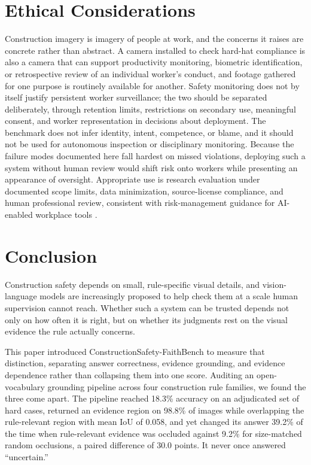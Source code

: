\documentclass[conference]{IEEEtran}
\begin{document}
\section{Ethical Considerations}

Construction imagery is imagery of people at work, and the concerns it raises are concrete rather than abstract. A camera installed to check hard-hat compliance is also a camera that can support productivity monitoring, biometric identification, or retrospective review of an individual worker's conduct, and footage gathered for one purpose is routinely available for another. Safety monitoring does not by itself justify persistent worker surveillance; the two should be separated deliberately, through retention limits, restrictions on secondary use, meaningful consent, and worker representation in decisions about deployment. The benchmark does not infer identity, intent, competence, or blame, and it should not be used for autonomous inspection or disciplinary monitoring. Because the failure modes documented here fall hardest on missed violations, deploying such a system without human review would shift risk onto workers while presenting an appearance of oversight. Appropriate use is research evaluation under documented scope limits, data minimization, source-license compliance, and human professional review, consistent with risk-management guidance for AI-enabled workplace tools \cite{nist2023,howard2024}.

\section{Conclusion}

Construction safety depends on small, rule-specific visual details, and vision-language models are increasingly proposed to help check them at a scale human supervision cannot reach. Whether such a system can be trusted depends not only on how often it is right, but on whether its judgments rest on the visual evidence the rule actually concerns.

This paper introduced ConstructionSafety-FaithBench to measure that distinction, separating answer correctness, evidence grounding, and evidence dependence rather than collapsing them into one score. Auditing an open-vocabulary grounding pipeline across four construction rule families, we found the three come apart. The pipeline reached 18.3\% accuracy on an adjudicated set of hard cases, returned an evidence region on 98.8\% of images while overlapping the rule-relevant region with mean IoU of 0.058, and yet changed its answer 39.2\% of the time when rule-relevant evidence was occluded against 9.2\% for size-matched random occlusions, a paired difference of 30.0 points. It never once answered ``uncertain.''
\end{document}
